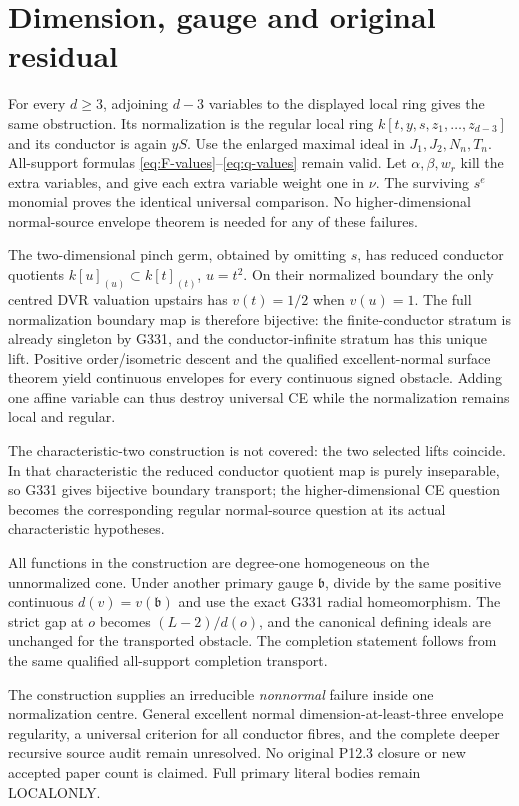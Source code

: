 \documentclass[11pt]{article}
\begin{document}
\section{Dimension, gauge and original residual}
For every $d\ge3$, adjoining $d-3$ variables to the displayed local
ring gives the same obstruction. Its normalization is the regular
local ring $k[t,y,s,z_1,\ldots,z_{d-3}]$ and its conductor is again
$yS$. Use the enlarged maximal ideal in $J_1,J_2,N_n,T_n$.
All-support formulas \eqref{eq:F-values}--\eqref{eq:q-values}
remain valid. Let $\alpha,\beta,w_r$ kill the extra variables,
and give each extra variable weight one in $\nu$.
The surviving $s^e$ monomial proves the identical universal
comparison. No higher-dimensional normal-source envelope theorem is
needed for any of these failures.

The two-dimensional pinch germ, obtained by omitting $s$, has reduced
conductor quotients $k[u]_{(u)}\subset k[t]_{(t)}$, $u=t^2$.
On their normalized boundary the only centred DVR valuation upstairs
has $v(t)=1/2$ when $v(u)=1$. The full normalization boundary map is
therefore bijective: the finite-conductor stratum is already singleton
by G331, and the conductor-infinite stratum has this unique lift.
Positive order/isometric descent and the qualified excellent-normal
surface theorem yield continuous envelopes for every continuous
signed obstacle. Adding one affine variable can thus destroy universal
CE while the normalization remains local and regular.

The characteristic-two construction is not covered: the two selected
lifts coincide. In that characteristic the reduced conductor quotient
map is purely inseparable, so G331 gives bijective boundary transport;
the higher-dimensional CE question becomes the corresponding regular
normal-source question at its actual characteristic hypotheses.

All functions in the construction are degree-one homogeneous on the
unnormalized cone. Under another primary gauge $\mathfrak b$, divide
by the same positive continuous $d(v)=v(\mathfrak b)$ and use the
exact G331 radial homeomorphism. The strict gap at $o$ becomes
$(L-2)/d(o)$, and the canonical defining ideals are unchanged for the
transported obstacle. The completion statement follows from the same
qualified all-support completion transport.

The construction supplies an irreducible \emph{nonnormal} failure
inside one normalization centre. General excellent normal
dimension-at-least-three envelope regularity, a universal criterion
for all conductor fibres, and the complete deeper recursive source
audit remain unresolved. No original P12.3 closure or new accepted
paper count is claimed. Full primary literal bodies remain LOCALONLY.
\end{document}
